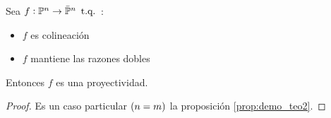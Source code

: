 \begin{teo}
    Sea $f : \mathbb{P}^n \to \bar{\mathbb{P}}^n \operatorname{\text{ t.q. }}$:
    \begin{itemize}
        \item $f$ es colineación
        \item $f$ mantiene las razones dobles
    \end{itemize}
    Entonces $f$ es una proyectividad.
\end{teo}
\begin{proof}
    Es un caso particular $\left( n = m \right)$ la proposición \ref{prop:demo_teo2}.
\end{proof}








































